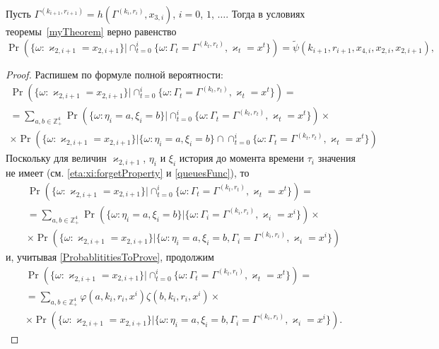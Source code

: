 \documentclass[a4paper,12pt,russian]{extarticle}
\begin{document}
\begin{corollary}
Пусть $\Gamma^{(k_{i+1},r_{i+1})}=h(\Gamma^{(k_i,r_i)},x_{3,i})$, $i=0$, $1$, $\ldots$. Тогда в условиях теоремы~\ref{myTheorem} верно равенство
\begin{equation}
\Pr (\{ \omega \colon \varkappa_{2,i+1} = x_{2,i+1}\} |\cap_{t=0}^{i}\{\omega\colon \Gamma_t=\Gamma^{(k_t,r_t)}, \varkappa_t=x^t\})=\widetilde{\psi}(k_{i+1},r_{i+1},x_{4,i},x_{2,i},x_{2,i+1}),
\label{kappa:2:conditional}
\end{equation}
\end{corollary}
\begin{proof}
Распишем по формуле полной вероятности:
\begin{multline*}
\Pr (\{ \omega \colon \varkappa_{2,i+1} = x_{2,i+1}\} |\cap_{t=0}^{i}\{\omega\colon \Gamma_t=\Gamma^{(k_t,r_t)}, \varkappa_t=x^t\}) = \\
= \sum_{a,b\in \mathbb{Z}_+^4} \Pr (\{ \omega \colon \eta_i=a, \xi_i=b\} |\cap_{t=0}^{i}\{\omega\colon \Gamma_t=\Gamma^{(k_t,r_t)}, \varkappa_t=x^t\}) \times \\
\times \Pr (\{ \omega \colon \varkappa_{2,i+1} = x_{2,i+1}\} |\{\omega\colon \eta_i=a, \xi_i=b\}\cap \cap_{t=0}^{i}\{\omega\colon \Gamma_t=\Gamma^{(k_t,r_t)}, \varkappa_t=x^t\})
\end{multline*}
Поскольку для величин $\varkappa_{2,i+1}$, $\eta_i$ и $\xi_i$ история до момента времени $\tau_i$ значения не имеет (см. \eqref{eta:xi:forgetProperty} и \eqref{queuesFunc}), то
\begin{multline*}
\Pr (\{ \omega \colon \varkappa_{2,i+1} = x_{2,i+1}\} |\cap_{t=0}^{i}\{\omega\colon \Gamma_t=\Gamma^{(k_t,r_t)}, \varkappa_t=x^t\}) = \\
=\sum_{a,b\in \mathbb{Z}_+^4} \Pr (\{ \omega \colon \eta_i=a, \xi_i=b\} |\{\omega\colon \Gamma_i=\Gamma^{(k_i,r_i)}, \varkappa_i=x^i\}) \times \\
\times \Pr (\{ \omega \colon \varkappa_{2,i+1} = x_{2,i+1}\} |\{\omega\colon \eta_i=a, \xi_i=b, \Gamma_i=\Gamma^{(k_i,r_i)}, \varkappa_i=x^i\}) 
\end{multline*}
и, учитывая \eqref{ProbablititiesToProve}, продолжим
\begin{multline*}
\Pr (\{ \omega \colon \varkappa_{2,i+1} = x_{2,i+1}\} |\cap_{t=0}^{i}\{\omega\colon \Gamma_t=\Gamma^{(k_t,r_t)}, \varkappa_t=x^t\}) =\\
=\sum_{a,b\in \mathbb{Z}_+^4} \varphi(a,k_i,r_i,x^i)\zeta(b,k_i,r_i,x^i) \times\\
\times \Pr (\{ \omega \colon \varkappa_{2,i+1} = x_{2,i+1}\} |\{\omega\colon \eta_i=a, \xi_i=b, \Gamma_i=\Gamma^{(k_i,r_i)}, \varkappa_i=x^i\}).
\end{multline*}


\end{proof}
\end{document}
